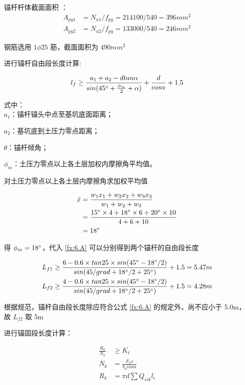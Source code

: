 锚杆杆体截面面积 ： 
\begin{align}
A_{py1}&=N_{u1}/f_{py}=214100/540=396mm^2\\
A_{py2}&=N_{u2}/f_{py}=133000/540=246mm^2
\end{align}

钢筋选用 $1 \phi 25$ 筋，截面面积为 $490mm^2$

进行锚杆自由段长度计算:

\begin{align}
    \label{fx:6.A0}
    l_f \geq \frac{a_1+a_2-dtan\alpha}{sin(45^{\circ} +\frac{\phi_m}{2}+\alpha )}+\frac{d}{cos\alpha}+1.5
\end{align}

式中：\\

$a_1$：锚杆锚头中点至基坑底面距离；   

$a_2$：基坑底到土压力零点距离；      

$\theta$：锚杆倾角；                  

$\phi_m$：土压力零点以上各土层加权内摩擦角平均值。

对土压力零点以上各土层内摩擦角求加权平均值

\begin{align}
    \label{fx:6.A}
    \bar x&=\frac{w_1x_1+w_2x_2+w_3x_3}{w_1+w_2+w_3}\\
    &=\frac{15^{\circ}\times 4+18^{\circ}\times 6+20^{\circ}\times 10}{4+6+10} \notag \\
    &=18^{\circ} \notag
\end{align}

得 $\phi_m=18 ^{\circ}$，代入 \ref{fx:6.A} 可以分别得到两个锚杆的自由段长度

\begin{align*}
    L_{f1} &\geq \frac{6-0.6\times tan 25\times sin(45^{\circ} -18^{\circ} /2)}{sin(45/grad +18^{\circ} /2+25^{\circ} )}+1.5=5.47 m\\
    L_{f2} &\geq \frac{4-0.6\times tan 25\times sin(45^{\circ} -18^{\circ} /2)}{sin(45/grad +18^{\circ} /2+25^{\circ} )}+1.5=4.28 m
\end{align*}

根据规范，锚杆自由段长度除应符合公式 \ref{fx:6.A} 的规定外，尚不应小于 5.0m，故 $L_{f2}$ 取 5m

进行锚固段长度计算：

\begin{align}
    \label{fx:6.B}
    \frac{R_k}{N_k} &\geq K_t\\
    \label{fx:6.BA}
    N_k&=\frac{F_hs}{b_acos\alpha}\\
    \label{fx:6.BB}
    R_k&=\pi d \sum Q_{sik}l_i
\end{align}


